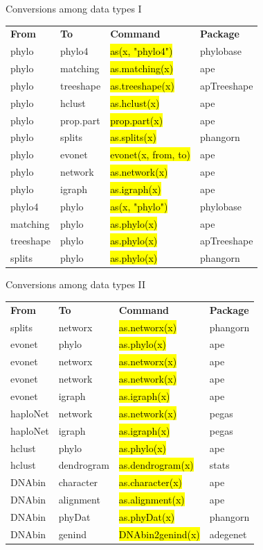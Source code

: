 \documentclass[compress, ucs, xelatex, 11pt, xcolor=svgnames,
	hyperref={
		bookmarks=true,
		unicode=true,
		colorlinks=true,
		pdftitle={Molecular data in R},
		plainpages=false,
		pdfauthor={Vojtech Zeisek},
		pdfsubject={Course about phylogeny and evolution in R},
		pdfcreator={XeLaTeX},
		pdfkeywords={R, evolution, phylogeny, molecular data},
		linkcolor=Tomato,
		anchorcolor=SaddleBrown,
		citecolor=Goldenrod,
		filecolor=DarkMagenta,
		menucolor=Sienna,
		urlcolor=DarkTurquoise,
		pdftex},
	url={hyphens, lowtilde} %
	]{beamer}
\renewcommand{\texttt}[1]{\hl{\ttfamily #1}}
\begin{document}
\begin{frame}{Conversions among data types I}
	\begin{tabular}{llll}
		\textbf{From} & \textbf{To} & \textbf{Command} & \textbf{Package}\\
		phylo & phylo4 & \texttt{as(x, "phylo4")} & phylobase\\
		phylo & matching & \texttt{as.matching(x)} & ape\\
		phylo & treeshape & \texttt{as.treeshape(x)} & apTreeshape\\
		phylo & hclust & \texttt{as.hclust(x)} & ape\\
		phylo & prop.part & \texttt{prop.part(x)} & ape\\
		phylo & splits & \texttt{as.splits(x)} & phangorn\\
		phylo & evonet & \texttt{evonet(x, from, to)} & ape\\
		phylo & network & \texttt{as.network(x)} & ape\\
		phylo & igraph & \texttt{as.igraph(x)} & ape\\
		phylo4 & phylo & \texttt{as(x, "phylo")} & phylobase\\
		matching & phylo & \texttt{as.phylo(x)} & ape\\
		treeshape & phylo & \texttt{as.phylo(x)} & apTreeshape\\
		splits & phylo & \texttt{as.phylo(x)} & phangorn
	\end{tabular}
\end{frame}

\begin{frame}{Conversions among data types II}
	\begin{tabular}{llll}
		\textbf{From} & \textbf{To} & \textbf{Command} & \textbf{Package}\\
		splits & networx & \texttt{as.networx(x)} & phangorn\\
		evonet & phylo & \texttt{as.phylo(x)} & ape\\
		evonet & networx & \texttt{as.networx(x)} & ape\\
		evonet & network & \texttt{as.network(x)} & ape\\
		evonet & igraph & \texttt{as.igraph(x)} & ape\\
		haploNet & network & \texttt{as.network(x)} & pegas\\
		haploNet & igraph & \texttt{as.igraph(x)} & pegas\\
		hclust & phylo & \texttt{as.phylo(x)} & ape\\
		hclust & dendrogram & \texttt{as.dendrogram(x)} & stats\\
		DNAbin & character & \texttt{as.character(x)} & ape\\
		DNAbin & alignment & \texttt{as.alignment(x)} & ape\\
		DNAbin & phyDat & \texttt{as.phyDat(x)} & phangorn\\
		DNAbin & genind & \texttt{DNAbin2genind(x)} & adegenet
	\end{tabular}
\end{frame}
\end{document}
